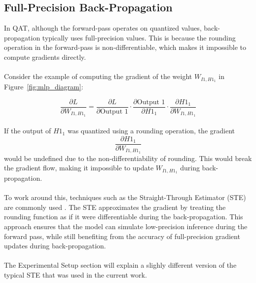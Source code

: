 \subsection{Full-Precision Back-Propagation}
\label{subsec:subsection1}
In QAT, although the forward-pass operates on quantized values, back-propagation typically uses full-precision values. 
This is because the rounding operation in the forward-pass is non-differentiable, which makes it impossible to compute gradients directly.
\\
\\
Consider the example of computing the gradient of the weight \( W_{I1,H1_1} \) in Figure~\ref{fig:mlp_diagram}:

\[
\frac{\partial L}{\partial W_{I1,H1_1}} = \frac{\partial L}{\partial \text{Output 1}} \cdot \frac{\partial \text{Output 1}}{\partial H1_1} \cdot \frac{\partial H1_1}{\partial W_{I1,H1_1}}
\]
\\
\noindent If the output of \( H1_1 \) was quantized using a rounding operation, the gradient 
\[
\frac{\partial H1_1}{\partial W_{I1,H1_1}} 
\]
would be undefined due to the non-differentiability of rounding. This would break the gradient flow, making it impossible to update  \( W_{I1,H1_1} \)
during back-propagation.
\\
\\
To work around this, techniques such as the Straight-Through Estimator (STE) are commonly used \cite{bengio2013estimating} \cite{fan2021training} \cite{zhuang2018towards}.
The STE approximates the gradient by treating the rounding function as if it were differentiable during the back-propagation.
This approach ensures that the model can simulate low-precision inference during the forward pass,
while still benefiting from the accuracy of full-precision gradient updates during back-propagation.
\\
\\
The Experimental Setup section will explain a slighly different version of the typical STE that was used in the current work.